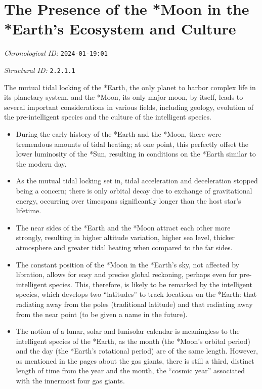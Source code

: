 \section{The Presence of the *Moon in the *Earth's Ecosystem and Culture}
\emph{Chronological ID:} \texttt{2024-01-19:01}

\emph{Structural ID:} \texttt{2.2.1.1}

The mutual tidal locking of the *Earth, the only planet to harbor complex life in its planetary system, and the *Moon, its only major moon, by itself, leads to several important considerations in various fields, including geology, evolution of the pre-intelligent species and the culture of the intelligent species.

\begin{itemize}
  \item During the early history of the *Earth and the *Moon, there were tremendous amounts of tidal heating; at one point, this perfectly offset the lower luminosity of the *Sun, resulting in conditions on the *Earth similar to the modern day.
  \item As the mutual tidal locking set in, tidal acceleration and deceleration stopped being a concern; there is only orbital decay due to exchange of gravitational energy, occurring over timespans significantly longer than the host star's lifetime.
  \item The near sides of the *Earth and the *Moon attract each other more strongly, resulting in higher altitude variation, higher sea level, thicker atmosphere and greater tidal heating when compared to the far sides.
  \item The constant position of the *Moon in the *Earth's sky, not affected by libration, allows for easy and precise global reckoning, perhaps even for pre-intelligent species. This, therefore, is likely to be remarked by the intelligent species, which develops two ``latitudes'' to track locations on the *Earth: that radiating away from the poles (traditional latitude) and that radiating away from the near point (to be given a name in the future).
  \item The notion of a lunar, solar and lunisolar calendar is meaningless to the intelligent species of the *Earth, as the month (the *Moon's orbital period) and the day (the *Earth's rotational period) are of the same length. However, as mentioned in the pages about the gas giants, there is still a third, distinct length of time from the year and the month, the ``cosmic year'' associated with the innermost four gas giants.
\end{itemize}
\newpage
